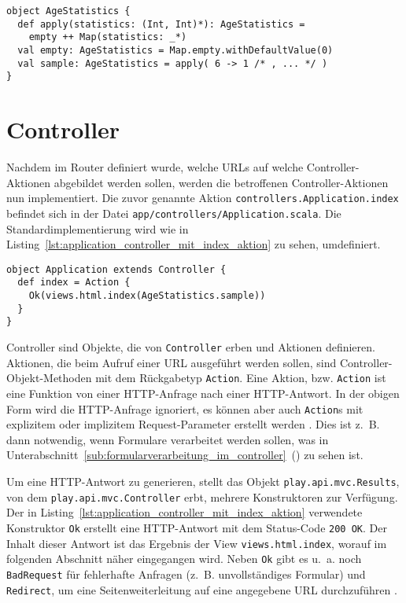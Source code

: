 \begin{lstlisting}[caption=Das AgeStatistics-Hilfsobjekt, label=lst:das_agestatistics_hilfsobjekt]
object AgeStatistics {
  def apply(statistics: (Int, Int)*): AgeStatistics =
    empty ++ Map(statistics: _*)
  val empty: AgeStatistics = Map.empty.withDefaultValue(0)
  val sample: AgeStatistics = apply( 6 -> 1 /* , ... */ )
}
\end{lstlisting}



\section{Controller} %
\label{sec:controller}

\begin{sloppypar} %
Nachdem im Router definiert wurde, welche URLs auf welche Controller-Aktionen abgebildet werden sollen, werden die betroffenen Controller-Aktionen nun implementiert.
Die zuvor genannte Aktion \lstinline|controllers.Application.index| befindet sich in der Datei \lstinline|app/controllers/Application.scala|.
Die Standardimplementierung wird wie in Listing~\ref{lst:application_controller_mit_index_aktion} zu sehen, umdefiniert.
\end{sloppypar}

\begin{lstlisting}[caption=Der Application-Controller mit index-Aktion, label=lst:application_controller_mit_index_aktion]
object Application extends Controller {
  def index = Action {
    Ok(views.html.index(AgeStatistics.sample))
  }
}
\end{lstlisting}

Controller sind Objekte, die von \lstinline|Controller| erben und Aktionen definieren.
Aktionen, die beim Aufruf einer URL ausgeführt werden sollen, sind Controller-Objekt-Methoden mit dem Rückgabetyp \lstinline|Action|.
Eine Aktion, bzw. \lstinline|Action| ist eine Funktion von einer HTTP-Anfrage nach einer HTTP-Antwort.
In der obigen Form wird die HTTP-Anfrage ignoriert, es können aber auch \lstinline|Action|s mit explizitem oder implizitem Request-Parameter erstellt werden \cite[vgl.][]{play_controllers}.
Dies ist z.~B. dann notwendig, wenn Formulare verarbeitet werden sollen, was in Unterabschnitt~\ref{sub:formularverarbeitung_im_controller}~() zu sehen ist.

Um eine HTTP-Antwort zu generieren, stellt das Objekt \lstinline|play.api.mvc.Results|, von dem \lstinline|play.api.mvc.Controller| erbt, mehrere Konstruktoren zur Verfügung.
Der in Listing~\ref{lst:application_controller_mit_index_aktion} verwendete Konstruktor \lstinline|Ok| erstellt eine HTTP-Antwort mit dem Status-Code \lstinline|200 OK|.
Der Inhalt dieser Antwort ist das Ergebnis der View \lstinline|views.html.index|, worauf im folgenden Abschnitt näher eingegangen wird.
Neben \lstinline|Ok| gibt es u.~a. noch \lstinline|BadRequest| für fehlerhafte Anfragen (z.~B. unvollständiges Formular) und \lstinline|Redirect|, um eine Seitenweiterleitung auf eine angegebene URL durchzuführen \cite[vgl.][]{play_controllers}.

